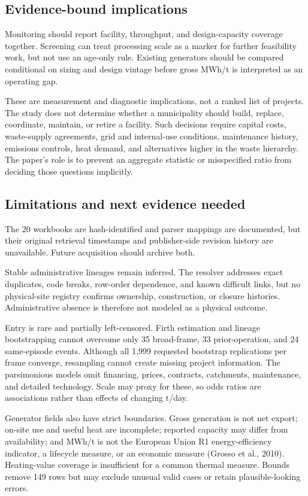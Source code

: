 \documentclass[11pt,letterpaper]{article}
\begin{document}
\subsection{Evidence-bound implications}

Monitoring should report facility, throughput, and design-capacity coverage
together. Screening can treat processing scale as a marker for further
feasibility work, but not use an age-only rule. Existing generators should be
compared conditional on sizing and design vintage before gross MWh/t is
interpreted as an operating gap.

These are measurement and diagnostic implications, not a ranked list of
projects. The study does not determine whether a municipality should build,
replace, coordinate, maintain, or retire a facility. Such decisions require
capital costs, waste-supply agreements, grid and internal-use conditions,
maintenance history, emissions controls, heat demand, and alternatives higher
in the waste hierarchy. The paper's role is to prevent an aggregate statistic
or misspecified ratio from deciding those questions implicitly.

\subsection{Limitations and next evidence needed}

The 20 workbooks are hash-identified and parser mappings are documented, but
their original retrieval timestamps and publisher-side revision history are
unavailable. Future acquisition should archive both.

Stable administrative lineages remain inferred. The resolver addresses exact
duplicates, code breaks, row-order dependence, and known difficult links, but no
physical-site registry confirms ownership, construction, or closure histories.
Administrative absence is therefore not modeled as a physical outcome.

Entry is rare and partially left-censored. Firth estimation and lineage
bootstrapping cannot overcome only 35 broad-frame, 33 prior-operation, and 24
same-episode events. Although all 1,999 requested bootstrap replications per frame converge,
resampling cannot create missing project information. The parsimonious models omit financing,
prices, contracts, catchments, maintenance, and detailed technology. Scale may
proxy for these, so odds ratios are associations rather than effects of changing
t/day.

Generator fields also have strict boundaries. Gross generation is not net
export; on-site use and useful heat are incomplete; reported capacity may differ
from availability; and MWh/t is not the European Union R1 energy-efficiency
indicator, a lifecycle measure, or an economic measure (Grosso et al., 2010).
Heating-value coverage is insufficient for a common thermal measure. Bounds
remove 149 rows but may exclude unusual valid cases or retain plausible-looking
errors.
\end{document}
